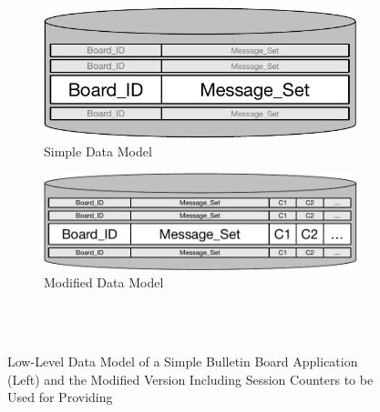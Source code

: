 \begin{figure}[h]
    \begin{subfigure}[b]{0.48\textwidth}
        \centering
	\includegraphics[scale = 0.5]{Figures/SimpleBulletinApp.pdf}
        \caption{Simple Data Model}
    \end{subfigure} 
    \begin{subfigure}[b]{0.48\textwidth}
        \centering
	\includegraphics[scale=0.5]{Figures/ModifiedBulletinBoard.pdf}
	\caption{Modified Data Model}
    \end{subfigure}
    \\ \hrulefill \\
\caption{Low-Level Data Model of a Simple Bulletin Board Application
(Left) and the Modified Version Including Session Counters to be Used
for Providing }

\end{figure}
